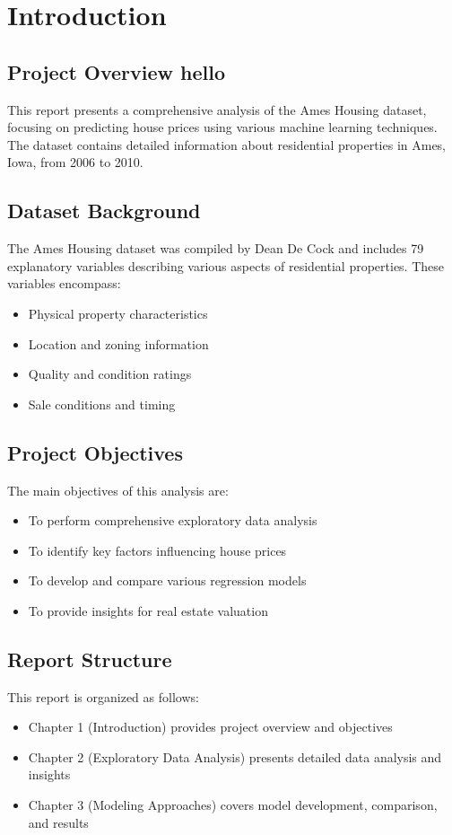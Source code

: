 \chapter{Introduction}

\section{Project Overview hello}
This report presents a comprehensive analysis of the Ames Housing dataset, focusing on predicting house prices using various machine learning techniques. The dataset contains detailed information about residential properties in Ames, Iowa, from 2006 to 2010.

\section{Dataset Background}
The Ames Housing dataset was compiled by Dean De Cock and includes 79 explanatory variables describing various aspects of residential properties. These variables encompass:
\begin{itemize}
    \item Physical property characteristics
    \item Location and zoning information
    \item Quality and condition ratings
    \item Sale conditions and timing
\end{itemize}

\section{Project Objectives}
The main objectives of this analysis are:
\begin{itemize}
    \item To perform comprehensive exploratory data analysis
    \item To identify key factors influencing house prices
    \item To develop and compare various regression models
    \item To provide insights for real estate valuation
\end{itemize}

\section{Report Structure}
This report is organized as follows:
\begin{itemize}
    \item Chapter 1 (Introduction) provides project overview and objectives
    \item Chapter 2 (Exploratory Data Analysis) presents detailed data analysis and insights
    \item Chapter 3 (Modeling Approaches) covers model development, comparison, and results
\end{itemize} 